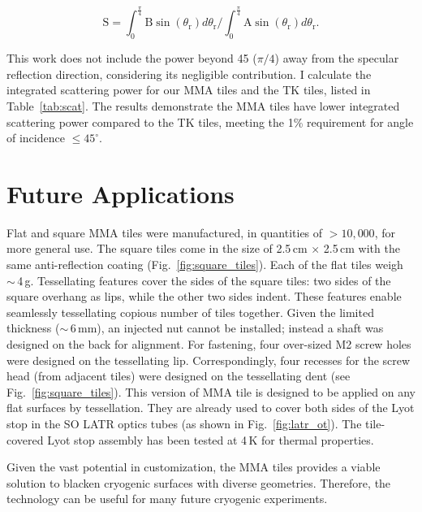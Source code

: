 \begin{equation}
\text{S} =\int_{0}^{\frac{\pi}{4}} \text{B} \sin(\theta_\text{r}) d\theta_\text{r} \bigg/ \int_{0}^{\frac{\pi}{4}} \text{A} \sin(\theta_\text{r}) d\theta_\text{r}.
\label{eq:scat}
\end{equation}

This work does not include the power beyond 45\dg{} ($\pi/4$) away from the specular reflection direction, considering its negligible contribution. I calculate the integrated scattering power for our MMA tiles and the TK tiles, listed in Table~\ref{tab:scat}. The results demonstrate the MMA tiles have lower integrated scattering power compared to the TK tiles, meeting the 1\% requirement for angle of incidence $\leq 45^{\circ}$.

\section{Future Applications}
\label{sec:future_applications}
Flat and square MMA tiles were manufactured, in quantities of $> 10,000$, for more general use. The square tiles come in the size of 2.5\,cm $\times$ 2.5\,cm with the same anti-reflection coating (Fig.~\ref{fig:square_tiles}). Each of the flat tiles weigh $\sim$\,4\,g. Tessellating features cover the sides of the square tiles: two sides of the square overhang as lips, while the other two sides indent. These features enable seamlessly tessellating copious number of tiles together. Given the limited thickness ($\sim$\,6\,mm), an injected nut cannot be installed; instead a shaft was designed on the back for alignment. For fastening, four over-sized M2 screw holes were designed on the tessellating lip. Correspondingly, four recesses for the screw head (from adjacent tiles) were designed on the tessellating dent (see Fig.~\ref{fig:square_tiles}). This version of MMA tile is designed to be applied on any flat surfaces by tessellation. They are already used to cover both sides of the Lyot stop in the SO LATR optics tubes (as shown in Fig.~\ref{fig:latr_ot}). The tile-covered Lyot stop assembly has been tested at 4\,K for thermal properties. 



Given the vast potential in customization, the MMA tiles provides a viable solution to blacken cryogenic surfaces with diverse geometries. Therefore, the technology can be useful for many future cryogenic experiments.

